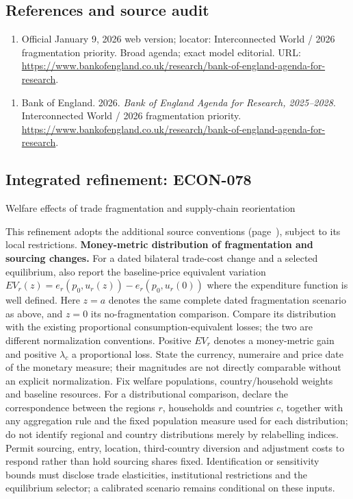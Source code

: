 \documentclass[11pt,a4paper]{article}
\begin{document}
\subsection*{References and source audit}
\begin{enumerate}
\item Official January 9, 2026 web version; locator: Interconnected World / 2026 fragmentation priority. Broad agenda; exact model editorial. URL: \url{https://www.bankofengland.co.uk/research/bank-of-england-agenda-for-research}.
\end{enumerate}
\begin{enumerate}\raggedright
\item\hypertarget{definitions:source:30007626:1}{} Bank of England. 2026. \emph{Bank of England Agenda for Research, 2025–2028}. Interconnected World / 2026 fragmentation priority.
\url{https://www.bankofengland.co.uk/research/bank-of-england-agenda-for-research}.
\end{enumerate}

\subsection*{Integrated refinement: ECON-078}
{\sffamily\small\color{muted}Welfare effects of trade fragmentation and supply-chain reorientation\par}
This refinement adopts the additional source conventions
(page~\pageref{audited:conventions}), subject to its local restrictions.
\textbf{Money-metric distribution of fragmentation and sourcing changes.}
For a dated bilateral trade-cost change and a selected equilibrium, also report
the baseline-price equivalent variation
$EV_r(z)=e_r(p_0,u_r(z))-e_r(p_0,u_r(0))$ where the expenditure function is
well defined. Here $z=a$ denotes the same complete dated fragmentation scenario
as above, and $z=0$ its no-fragmentation comparison. Compare its distribution
with the existing proportional consumption-equivalent losses; the two are
different normalization conventions. Positive $EV_r$ denotes a money-metric
gain and positive $\lambda_c$ a proportional loss. State the currency,
numeraire and price date of the monetary measure; their magnitudes are not
directly comparable without an explicit normalization.
Fix welfare populations, country/household weights and baseline resources.
For a distributional comparison, declare the correspondence between the regions
$r$, households and countries $c$, together with any aggregation rule and the
fixed population measure used for each distribution; do not identify regional
and country distributions merely by relabelling indices.
Permit sourcing, entry, location, third-country diversion and adjustment costs
to respond rather than hold sourcing shares fixed. Identification or sensitivity
bounds must disclose trade elasticities, institutional restrictions and the
equilibrium selector; a calibrated scenario remains conditional on these inputs.
\end{document}
